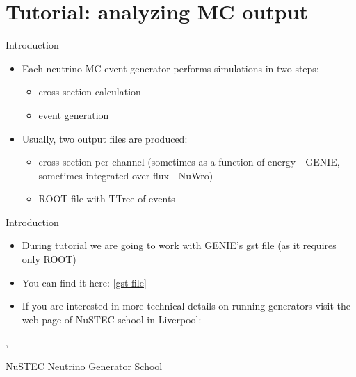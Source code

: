 \section[toc=Tutorial generators]{Tutorial: analyzing MC output}

\begin{slide}{Introduction}
\null\vfill

  \begin{itemize}
   
    \item Each neutrino MC event generator performs simulations in two steps:
    
    \begin{itemize}
      \item cross section calculation
      \item event generation
    \end{itemize}
    
    \item Usually, two output files are produced:
    
    \begin{itemize}
     \item cross section per channel (sometimes as a function of energy - GENIE, sometimes integrated over flux - NuWro)
     \item ROOT file with TTree of events
    \end{itemize}
        
  \end{itemize}

\vfill\null
\end{slide}

\begin{slide}[toc=]{Introduction}
\null\vfill

  \begin{itemize}
  
    \item During tutorial we are going to work with GENIE's gst file (as it requires only ROOT)
    
    \item You can find it here: \href{http://home.fnal.gov/~goran/NUSTEC_tutorial/nustec_sample.gst.root}{[gst file]}
    
    \item If you are interested in more technical details on running generators visit the web page of NuSTEC school in Liverpool:
    
  \end{itemize}
  
  \sep
  
  \centering\href{http://school.genie-mc.org/}{NuSTEC Neutrino Generator School}

\vfill\null
\end{slide}

